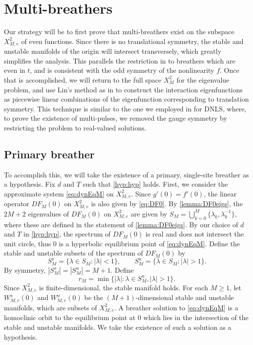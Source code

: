 \documentclass[12pt,reqno]{amsart}
\begin{document}
\section{Multi-breathers}

Our strategy will be to first prove that multi-breathers exist on the subspace $X_{M,e}^2$ of even functions. Since there is no translational symmetry, the stable and unstable manifolds of the origin will intersect transversely, which greatly simplifies the analysis. This parallels the restriction in \cite{Pelinovsky2012} to breathers which are even in $t$, and is consistent with the odd symmetry of the nonlinearity $f$. 
Once that is accomplished, we will return to the full space $X_{M}^2$ for the eigenvalue problem, and use Lin's method as in \cites{Parker2021,Parker2020,Sandstede1998} to construct the interaction eigenfunctions as piecewise linear combinations of the eigenfunction corresponding to translation symmetry. This technique is similar to the one we employed in \cite{Parker2020} for DNLS, where, to prove the existence of multi-pulses, we removed the gauge symmetry by restricting the problem to real-valued solutions.

\subsection{Primary breather}

To accomplish this, we will take the existence of a primary, single-site breather as a hypothesis. 
Fix $d$ and $T$ such that \cref{hyp:hyp} holds. First, we consider the approximate system \cref{eq:dynEqM} on $X_{M,e}^2$.  Since $g'(0) = f'(0)$, the linear operator $DF_M(0)$ on $X_{M,e}^2$ is also given by \cref{eq:DF0}. By \cref{lemma:DF0eigs}, the $2M+2$ eigenvalues of $DF_M(0)$ on $X_{M,e}^2$ are given by $S_M = \bigcup_{k=0}^M \{\lambda_k, \lambda_k^{-1} \}$, where these are defined in the statement of \cref{lemma:DF0eigs}. By our choice of $d$ and $T$ in \cref{hyp:hyp}, the spectrum of $DF_M(0)$ is real and does not intersect the unit circle, thus 0 is a hyperbolic equilibrium point of \cref{eq:dynEqM}. Define the stable and unstable subsets of the spectrum of $DF_M(0)$ by
\[
S_M^s = \{ \lambda \in S_M : |\lambda| < 1\}, \qquad S_M^u = \{ \lambda \in S_M : |\lambda| > 1\}.
\]
By symmetry, $|S_M^s| = |S_M^u| = M+1$. Define
\begin{equation}\label{eq:defrM}
r_M = \min \{ |\lambda| : \lambda \in S_M^u, |\lambda| > 1 \}.
\end{equation}
Since $X_{M,e}^2$ is finite-dimensional, the stable manifold holds. For each $M \geq 1$, let $W_{M,e}^s(0)$ and $W_{M,e}^u(0)$ be the $(M+1)$-dimensional stable and unstable manifolds, which are subsets of $X_{M,e}^2$. A breather solution to \cref{eq:dynEqM} is a homoclinic orbit to the equilibrium point at 0 which lies in the intersection of the stable and unstable manifolds. We take the existence of such a solution as a hypothesis.
\end{document}
